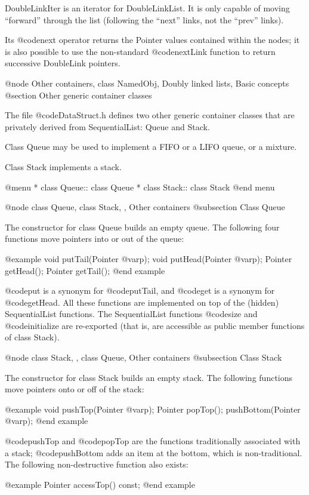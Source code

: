 DoubleLinkIter is an iterator for DoubleLinkList.  It is only capable
of moving ``forward'' through the list (following the ``next'' links,
not the ``prev'' links).

Its @code{next} operator returns the Pointer values contained within
the nodes; it is also possible to use the non-standard @code{nextLink}
function to return successive DoubleLink pointers.

@node Other containers, class NamedObj, Doubly linked lists, Basic concepts
@section Other generic container classes

The file @code{DataStruct.h} defines two other generic container classes
that are privately derived from SequentialList: Queue and Stack.

Class Queue may be used to implement a FIFO or a LIFO queue, or a
mixture.

Class Stack implements a stack.

@menu
* class Queue::     class Queue
* class Stack::     class Stack
@end menu

@node class Queue, class Stack,  , Other containers
@subsection Class Queue

The constructor for class Queue builds an empty queue.  The following
four functions move pointers into or out of the queue:

@example
void putTail(Pointer @var{p});
void putHead(Pointer @var{p});
Pointer getHead();
Pointer getTail();
@end example

@code{put} is a synonym for @code{putTail}, and @code{get} is a synonym
for @code{getHead}.  All these functions are implemented on top of the
(hidden) SequentialList functions.  The SequentialList functions
@code{size} and @code{initialize} are re-exported (that is, are
accessible as public member functions of class Stack).

@node class Stack,  , class Queue, Other containers
@subsection Class Stack

The constructor for class Stack builds an empty stack.  The following
functions move pointers onto or off of the stack:

@example
void pushTop(Pointer @var{p});
Pointer popTop();
pushBottom(Pointer @var{p});
@end example

@code{pushTop} and @code{popTop} are the functions traditionally
associated with a stack; @code{pushBottom} adds an item at the bottom,
which is non-traditional.  The following non-destructive function
also exists:

@example
Pointer accessTop() const;
@end example

